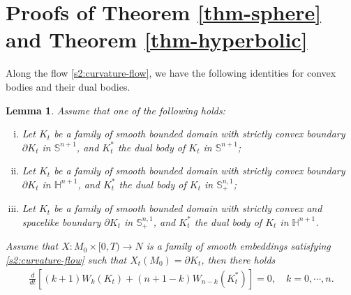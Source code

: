 \documentclass[11pt,reqno]{amsart}
\newtheorem{lem}[thm]{Lemma}
\theoremstyle{definition}
\theoremstyle{remark}
\numberwithin{equation}{section}
\renewcommand{\(}{\left(}
\renewcommand{\)}{\right)}
\renewcommand{\~}{\tilde}
\renewcommand{\-}{\overline}
\newcommand{\ra}{\rightarrow}
\begin{document}
\section{Proofs of Theorem \ref{thm-sphere} and Theorem \ref{thm-hyperbolic}}\label{sec:4}
Along the flow \eqref{s2:curvature-flow}, we have the following identities for convex bodies and their dual bodies.
\begin{lem}\label{s4:lem-identity}
	Assume that one of the following holds:
	\begin{enumerate}[(i)]
		\item Let $K_t$ be a family of smooth bounded domain with strictly convex boundary $\partial K_t$ in $\mathbb S^{n+1}$, and $K_t^\ast$ the dual body of $K_t$ in $\mathbb S^{n+1}$;
		\item Let $K_t$ be a family of smooth bounded domain with strictly convex boundary $\partial K_t$ in $\mathbb H^{n+1}$, and $K_t^\ast$ the dual body of $K_t$ in $\mathbb S^{n,1}_{+}$;
		\item Let $K_t$ be a family of smooth bounded domain with strictly convex and spacelike boundary $\partial K_t$ in $\mathbb S^{n,1}_{+}$, and $K_t^\ast$ the dual body of $K_t$ in $\mathbb H^{n+1}$.
\end{enumerate}	
	    Assume that $X:M_0 \times [0,T) \ra N$ is a family of smooth embeddings satisfying \eqref{s2:curvature-flow} such that $X_t(M_0)=\partial K_t$, then there holds
	\begin{align}\label{s4:evol-identity}
	\frac{d}{dt}\left[ (k+1)W_k(K_t)+(n+1-k)W_{n-k}(K_t^\ast)\right]=0, \quad k=0,\cdots,n.
	\end{align}
\end{lem}
\end{document}
